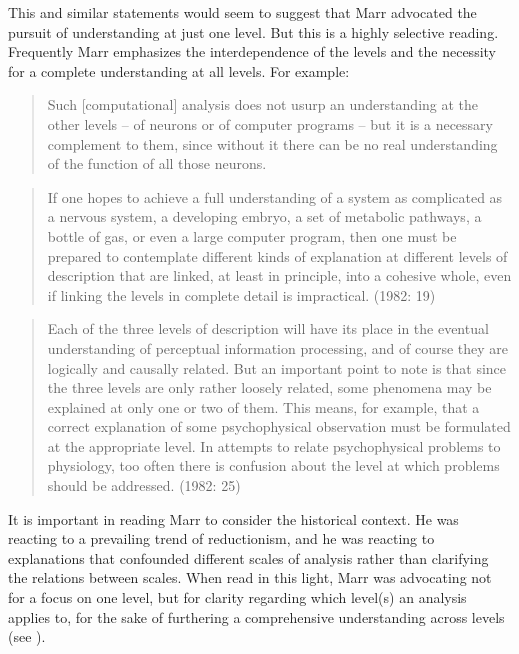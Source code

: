 This and similar statements would seem to suggest that Marr advocated the pursuit of understanding at just one level. But this is a highly selective reading. Frequently Marr emphasizes the interdependence of the levels and the necessity for a complete understanding at all levels. For example:

\begin{quote} 
Such [computational] analysis does not usurp an understanding at the other levels -- of neurons or of computer programs -- but it is a necessary complement to them, since without it there can be no real understanding of the function of all those neurons. \citep[19]{Marr1982}
\end{quote}

\begin{quote}
If one hopes to achieve a full understanding of a system as complicated as a nervous system, a developing embryo, a set of metabolic pathways, a bottle of gas, or even a large computer program, then one must be prepared to contemplate different kinds of explanation at different levels of description that are linked, at least in principle, into a cohesive whole, even if linking the levels in complete detail is impractical. (1982: 19)
\end{quote}

\begin{quote} 
Each of the three levels of description will have its place in the eventual understanding of perceptual information processing, and of course they are logically and causally related. But an important point to note is that since the three levels are only rather loosely related, some phenomena may be explained at only one or two of them. This means, for example, that a correct explanation of some psychophysical observation must be formulated at the appropriate level. In attempts to relate psychophysical problems to physiology, too often there is confusion about the level at which problems should be addressed. (1982: 25)
\end{quote}

It is important in reading Marr to consider the historical context. He was reacting to a prevailing trend of reductionism, and he was reacting to explanations that confounded different scales of analysis rather than clarifying the relations between scales. When read in this light, Marr was advocating not for a focus on one level, but for clarity regarding which level(s) an analysis applies to, for the sake of furthering a comprehensive understanding across levels (see \citealt{EliasmithKolbeck2015}). 

